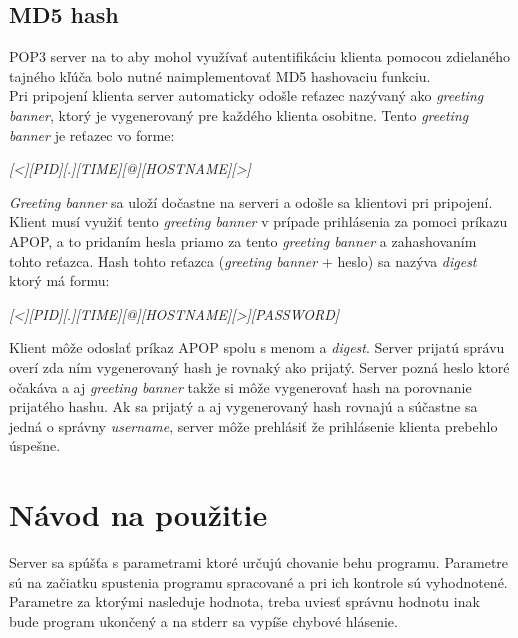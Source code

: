 \documentclass[11pt,a4paper]{article}
\begin{document}
	\subsection{MD5 hash}
		\indent POP3 server na to aby mohol využívať autentifikáciu klienta pomocou zdielaného tajného kľúča bolo nutné naimplementovať MD5 hashovaciu funkciu.\\[0.4em]
		\indent Pri pripojení klienta server automaticky odošle reťazec nazývaný ako \textit{greeting banner}, ktorý je vygenerovaný pre každého klienta osobitne. Tento \textit{greeting banner} je reťazec vo forme:
		\begin{center}
		\textit{[<][PID][.][TIME][@][HOSTNAME][>]}\\[0.4em]
		\end{center}
		\textit{Greeting banner} sa uloží dočastne na serveri a odošle sa klientovi pri pripojení. Klient musí využiť tento \textit{greeting banner} v prípade prihlásenia za pomoci príkazu APOP, a to pridaním hesla priamo za tento \textit{greeting banner} a zahashovaním tohto reťazca. Hash tohto reťazca (\textit{greeting banner} + heslo) sa nazýva \textit{digest} ktorý má formu:
		\begin{center}
		\textit{[<][PID][.][TIME][@][HOSTNAME][>][PASSWORD]}
		\end{center}
		Klient môže odoslať príkaz APOP spolu s menom a \textit{digest}. Server prijatú správu overí zda ním vygenerovaný hash je rovnaký ako prijatý. Server pozná heslo ktoré očakáva a aj \textit{greeting banner} takže si môže vygenerovať hash na porovnanie prijatého hashu. Ak sa prijatý a aj vygenerovaný hash rovnajú a súčastne sa jedná o správny \textit{username}, server môže prehlásiť že prihlásenie klienta prebehlo úspešne.

\section{Návod na použitie}
	Server sa spúšťa s parametrami ktoré určujú chovanie behu programu. Parametre sú na začiatku spustenia programu spracované a pri ich kontrole sú vyhodnotené. Parametre za ktorými nasleduje hodnota, treba uviesť správnu hodnotu inak bude program ukončený a na stderr sa vypíše chybové hlásenie.\\
\end{document}
